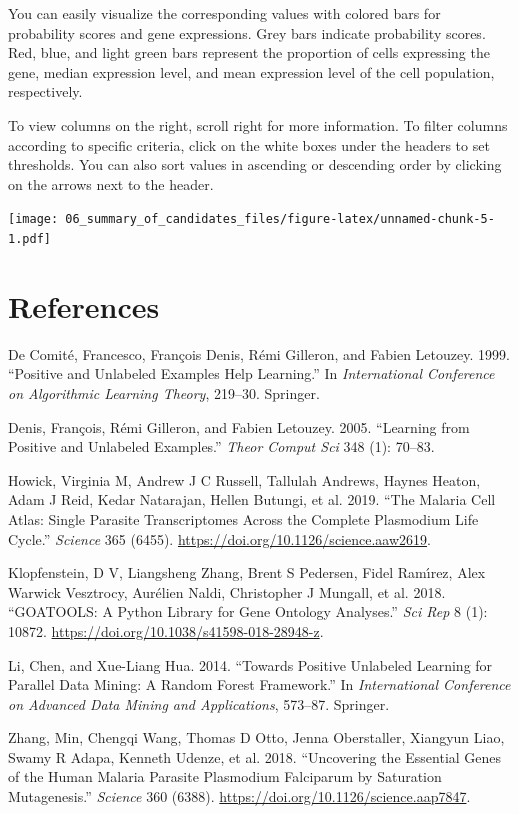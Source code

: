 \documentclass[
  11pt,
  oneside]{book}
\newlength{\cslhangindent}
\newlength{\cslentryspacingunit} %
\newenvironment{CSLReferences}[2] %
 {%
  \setlength{\parindent}{0pt}
  \ifodd #1
  \let\oldpar\par
  \def\par{\hangindent=\cslhangindent\oldpar}
  \fi
  \setlength{\parskip}{#2\cslentryspacingunit}
 }%
 {}
\begin{document}
You can easily visualize the corresponding values with colored bars for probability scores and gene expressions. Grey bars indicate probability scores. Red, blue, and light green bars represent the proportion of cells expressing the gene, median expression level, and mean expression level of the cell population, respectively.

To view columns on the right, scroll right for more information. To filter columns according to specific criteria, click on the white boxes under the headers to set thresholds. You can also sort values in ascending or descending order by clicking on the arrows next to the header.

\texttt{[image: 06\_summary\_of\_candidates\_files/figure-latex/unnamed-chunk-5-1.pdf]}

\hypertarget{references}{%
\chapter*{References}\label{references}}

\hypertarget{refs}{}
\begin{CSLReferences}{1}{0}
\leavevmode{}%
De Comité, Francesco, François Denis, Rémi Gilleron, and Fabien Letouzey. 1999. {``Positive and Unlabeled Examples Help Learning.''} In \emph{International Conference on Algorithmic Learning Theory}, 219--30. Springer.

\leavevmode{}%
Denis, François, Rémi Gilleron, and Fabien Letouzey. 2005. {``Learning from Positive and Unlabeled Examples.''} \emph{Theor Comput Sci} 348 (1): 70--83.

\leavevmode{}%
Howick, Virginia M, Andrew J C Russell, Tallulah Andrews, Haynes Heaton, Adam J Reid, Kedar Natarajan, Hellen Butungi, et al. 2019. {``The Malaria Cell Atlas: Single Parasite Transcriptomes Across the Complete Plasmodium Life Cycle.''} \emph{Science} 365 (6455). \url{https://doi.org/10.1126/science.aaw2619}.

\leavevmode{}%
Klopfenstein, D V, Liangsheng Zhang, Brent S Pedersen, Fidel Ramı́rez, Alex Warwick Vesztrocy, Aurélien Naldi, Christopher J Mungall, et al. 2018. {``GOATOOLS: A Python Library for Gene Ontology Analyses.''} \emph{Sci Rep} 8 (1): 10872. \url{https://doi.org/10.1038/s41598-018-28948-z}.

\leavevmode{}%
Li, Chen, and Xue-Liang Hua. 2014. {``Towards Positive Unlabeled Learning for Parallel Data Mining: A Random Forest Framework.''} In \emph{International Conference on Advanced Data Mining and Applications}, 573--87. Springer.

\leavevmode{}%
Zhang, Min, Chengqi Wang, Thomas D Otto, Jenna Oberstaller, Xiangyun Liao, Swamy R Adapa, Kenneth Udenze, et al. 2018. {``Uncovering the Essential Genes of the Human Malaria Parasite Plasmodium Falciparum by Saturation Mutagenesis.''} \emph{Science} 360 (6388). \url{https://doi.org/10.1126/science.aap7847}.

\end{CSLReferences}
\end{document}
